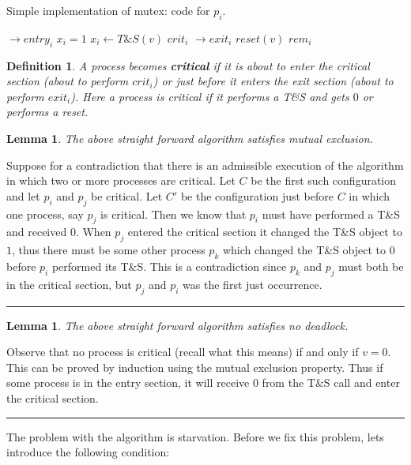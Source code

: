 \documentclass[twoside]{article}
\newtheorem{lemma}[theorem]{Lemma}
\newtheorem{definition}[theorem]{Definition}
\newenvironment{proof}{{\bf Proof:}}{\hfill\rule{2mm}{2mm}}
\begin{document}
\begin{algorithm}
	\caption{Simple implementation of mutex: code for $p_i$.}
    \label{pseudocode:mutex}
    \begin{algorithmic}[1]
	\State $\rightarrow entry_i$
	\State $x_i = 1$
		\State $x_i \leftarrow T\&S(v)$
	\EndWhile
	\State $crit_i$
	\State
	\State $\rightarrow exit_i$
	\State $reset(v)$
	\State $rem_i$
	\end{algorithmic}
\end{algorithm}

\begin{definition}
A process becomes \textbf{critical} if it is about to enter the critical section (about to perform $crit_i$) or just before it enters the exit section (about to perform $exit_i$). Here a process is critical if it performs a T\&S and gets $0$ or performs a reset. 
\end{definition} 

\begin{lemma}
The above straight forward algorithm satisfies mutual exclusion.
\end{lemma}
\begin{proof}
Suppose for a contradiction that there is an admissible execution of the algorithm in which two or more processes are critical. Let $C$ be the first such configuration and let $p_i$ and $p_j$ be critical. Let $C'$ be the configuration just before $C$ in which one process, say $p_j$ is critical. Then we know that $p_i$ must have performed a T\&S and received $0$. When $p_j$ entered the critical section it changed the T\&S object to $1$, thus there must be some other process $p_k$ which changed the T\&S object to 0 before $p_i$ performed its T\&S. This is a contradiction since $p_k$ and $p_j$ must both be in the critical section, but $p_j$ and $p_i$ was the first just occurrence. 
\end{proof}

\begin{lemma}
The above straight forward algorithm satisfies no deadlock.
\end{lemma}
\begin{proof}
Observe that no process is critical (recall what this means) if and only if $v = 0$. This can be proved by induction using the mutual exclusion property. Thus if some process is in the entry section, it will receive $0$ from the T\&S call and enter the critical section. 
\end{proof}

The problem with the algorithm is starvation. Before we fix this problem, lets introduce the following condition:
\end{document}
